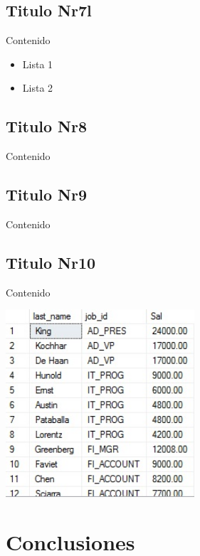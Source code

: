 \documentclass[twoside,twocolumn]{article}
\begin{document}
\subsection{Titulo Nr7l}
Contenido

\begin{itemize}	

	\item Lista 1
	\item Lista 2

\end{itemize} 



\subsection{Titulo Nr8}
Contenido 


\subsection{Titulo Nr9}
Contenido 



\subsection{Titulo Nr10}
Contenido 

\begin{center}
	\includegraphics[width=7cm]{./Imagenes/img} 
\end{center}


\section{Conclusiones}
\end{document}

